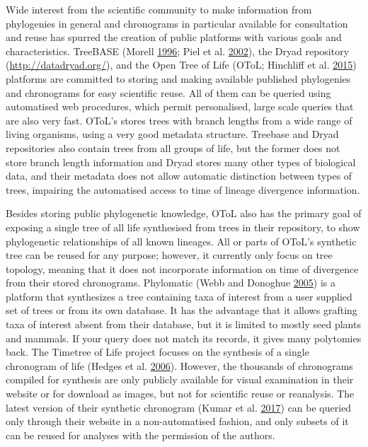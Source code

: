 \documentclass[]{article}
\begin{document}
Wide interest from the scientific community to make information from phylogenies in general and chronograms in particular available for consultation and reuse has spurred the creation of public platforms with various goals and characteristics. TreeBASE (Morell \protect\hyperlink{ref-morell1996roots}{1996}; Piel et al. \protect\hyperlink{ref-Piel2002}{2002}), the Dryad repository (\url{http://datadryad.org/}), and the Open Tree of Life (OToL; Hinchliff et al. \protect\hyperlink{ref-Hinchliff2015}{2015}) platforms are committed to storing and making available published phylogenies and chronograms for easy scientific reuse. All of them can be queried using automatised web procedures, which permit personalised, large scale queries that are also very fast.
OToL's stores trees with branch lengths from a wide range of living organisms, using a very good metadata structure. Treebase and Dryad repositories also contain trees from all groups of life, but the former does not store branch length information and Dryad stores many other types of biological data, and their metadata does not allow automatic distinction between types of trees, impairing the automatised access to time of lineage divergence information.

Besides storing public phylogenetic knowledge, OToL also has the primary goal of exposing a single tree of all life synthesised from trees in their repository, to show phylogenetic relationships of all known lineages.
All or parts of OToL's synthetic tree can be reused for any purpose; however, it currently only focus on tree topology, meaning that it does not incorporate information on time of divergence from their stored chronograms.
Phylomatic (Webb and Donoghue \protect\hyperlink{ref-webb2005phylomatic}{2005})
is a platform that synthesizes a tree containing taxa of interest from a user supplied set of trees or from its own database.
It has the advantage that it allows grafting taxa of interest absent from their database, but it is limited to mostly seed plants and mammals. If your query does not match its records, it gives many polytomies back.
The Timetree of Life project focuses on the synthesis of a single chronogram of life (Hedges et al. \protect\hyperlink{ref-Hedges2006}{2006}). However, the thousands of chronograms compiled for synthesis are only publicly available for visual examination in their website or for download as images, but not for scientific reuse or reanalysis. The latest version of their synthetic chronogram (Kumar et al. \protect\hyperlink{ref-Kumar2017}{2017}) can be queried only through their website in a non-automatised fashion, and only subsets of it can be reused for analyses with the permission of the authors.
\end{document}
